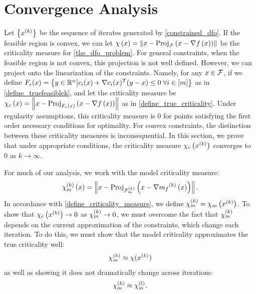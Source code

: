\section{Convergence Analysis}
\label{convex_convergence_analysis}

Let $\left\{x^{(k)}\right\}$ be the sequence of iterates generated by \cref{constrained_dfo}.  If the feasible region is convex, 
we can let $\chi\left(x\right) = \left\|x - {\textrm{Proj}}_{{\mathcal F}}\left(x- \nabla f\left(x\right)\right)\right\|$ be the criticality measure for \cref{the_dfo_problem}.     
For general constraints,  when the feasible region is not convex, this projection is not well defined.
However,
we can project onto the linearization of the constraints.
Namely, for any $x \in {\mathcal F}$, if we define $F_c(x) = \left\{y \in \mathbb R^n \big | c_i(x) + \nabla c_i(x)^T(y - x) \le 0 \; \forall i \in [m] \right\}$ as in \cref{define_truefeasiblek}, 
and let the criticality measure be
$\chi_c\left(x\right) = \left\|x - {\textrm{Proj}}_{F_c(x)}\left(x- \nabla f\left(x\right)\right)\right\|$ as in \cref{define_true_criticality}.
Under regularity assumptions, this criticality measure is $0$ for points satisfying the first order necessary conditions for optimality.
For convex constraints, the distinction between these criticality measures is inconsequential.
In this section, we prove that under appropriate conditions, the criticality measure $\chi_c\left(x^{(k)}\right)$ converges to $0$ as $k\to\infty$.


For much of our analysis, we work with the model criticality measure:
\begin{align*}
{\chi_m^{(k)}}\left(x\right) = \left\|x - {\textrm{Proj}}_{{\mathcal F_m^{(k)}}}\left(x- \nabla {{m}_f}^{(k)}\left(x\right)\right)\right\|.
\end{align*}
In accordance with \cref{define_criticality_measure}, we define ${\chi_m^{(k)}} = \chi_m\left(x^{(k)}\right)$.
To show that $\chi_c\left(x^{(k)}\right) \to 0$ as ${\chi_m^{(k)}} \to 0$, we must overcome the fact that
${\chi_m^{(k)}}$ depends on the current approximation of the constraints, which change each iteration.
To do this, we must show that the model criticality approximates the true criticality well:
\begin{align}
\label{verbiage_hoffman_use_one}
{\chi_m^{(k)}} \approx \chi (x^{(k)})
\end{align}
as well as showing it does not dramatically change across iterations:
\begin{align}
\label{verbiage_hoffman_use_two}
{\chi_m^{(k)}} \approx {\chi_m^{(l)}}.
\end{align}

